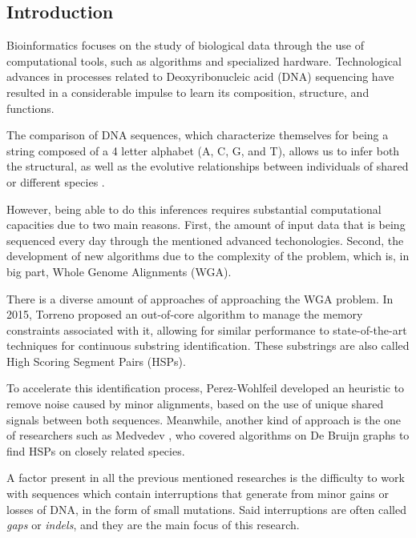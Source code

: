 \subsection{Introduction}

Bioinformatics focuses on the study of biological data through the use of computational tools, such as algorithms and specialized hardware. Technological advances in processes related to Deoxyribonucleic acid (DNA) sequencing have resulted in a considerable impulse to learn its composition, structure, and functions. 

\medskip

The comparison of DNA sequences, which characterize themselves for being a string composed of a 4 letter alphabet (A, C, G, and T), allows us to infer both the structural, as well as the evolutive relationships between individuals of shared or different species \cite{xiong_2006}.

\medskip

However, being able to do this inferences requires substantial computational capacities due to two main reasons. First, the amount of input data that is being sequenced every day through the mentioned advanced techonologies. Second, the development of new algorithms due to the complexity of the problem, which is, in big part, Whole Genome Alignments (WGA).

\medskip

There is a diverse amount of approaches of approaching the WGA problem. In 2015, Torreno \cite{Tirado2015BreakingTC} proposed an out-of-core algorithm to manage the memory constraints associated with it, allowing for similar performance to state-of-the-art techniques for continuous substring identification. These substrings are also called High Scoring Segment Pairs (HSPs). 

\medskip

To accelerate this identification process, Perez-Wohlfeil \cite{PrezWohlfeil2019UltrafastGC} developed an heuristic to remove noise caused by minor alignments, based on the use of unique shared signals between both sequences. Meanwhile, another kind of approach is the one of researchers such as Medvedev \cite{Minkin2019ScalableMW}, who covered algorithms on De Bruijn graphs to find HSPs on closely related species. 

\medskip

A factor present in all the previous mentioned researches is the difficulty to work with sequences which contain interruptions that generate from minor gains or losses of DNA, in the form of small mutations. Said interruptions are often called \textit{gaps} or \textit{indels}, and they are the main focus of this research. 

